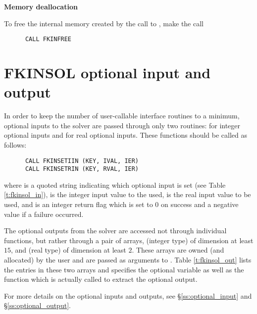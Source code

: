 \begin{Steps}
\item {\bf Memory deallocation}

  To free the internal memory created by the call to ,
  make the call
\begin{verbatim}
      CALL FKINFREE
\end{verbatim}

\end{Steps}


\section{FKINSOL optional input and output}\label{fkin_opt_inout}

In order to keep the number of user-callable {\fkinsol} interface routines to
a minimum, optional inputs to the {\kinsol} solver are passed through only two
routines:  for integer optional inputs and 
for real optional inputs. These functions should be called as follows:
\begin{verbatim}
      CALL FKINSETIIN (KEY, IVAL, IER)
      CALL FKINSETRIN (KEY, RVAL, IER)
\end{verbatim}
where  is a quoted string indicating which optional input is set
(see Table \ref{t:fkinsol_in}),
 is the integer input value to the used,
 is the real input value to be used, and
 is an integer return flag which is set to $0$ on success and
a negative value if a failure occurred.

The optional outputs from the {\kinsol} solver are accessed not through
individual functions, but rather through a pair of arrays, 
(integer type) of dimension at least $15$, and  (real type) of
dimension at least $2$.  These arrays are owned (and allocated) by the user
and are passed as arguments to .
Table \ref{t:fkinsol_out} lists the entries in these two arrays and specifies the
optional variable as well as the {\kinsol} function which is actually called to
extract the optional output.

For more details on the optional inputs and outputs, see \S\ref{ss:optional_input}
and \S\ref{ss:optional_output}.

